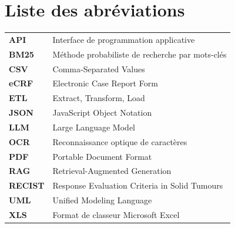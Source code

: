 \chapter*{Liste des abréviations}
\begin{longtable}{>{\bfseries}p{}p{}}
API & Interface de programmation applicative\\
BM25 & Méthode probabiliste de recherche par mots-clés\\
CSV & Comma-Separated Values\\
eCRF & Electronic Case Report Form\\
ETL & Extract, Transform, Load\\
JSON & JavaScript Object Notation\\
LLM & Large Language Model\\
OCR & Reconnaissance optique de caractères\\
PDF & Portable Document Format\\
RAG & Retrieval-Augmented Generation\\
RECIST & Response Evaluation Criteria in Solid Tumours\\
UML & Unified Modeling Language\\
XLS & Format de classeur Microsoft Excel
\end{longtable}
